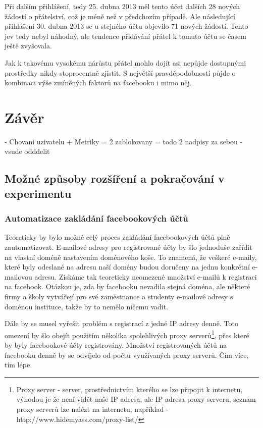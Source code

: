 \documentclass[thesis=M,czech]{FITthesis}[2013/05/10]
\begin{document}
Při dalším přihlášení, tedy 25. dubna 2013 měl tento účet dalších 28 nových žádostí o přátelství, což je méně než v předchozím případě. Ale následující přihlášení 30. dubna 2013 se u stejného účtu objevilo 71 nových žádostí. Tento jev tedy nebyl náhodný, ale tendence přidávání přátel k tomuto účtu se časem ještě zvyšovala.

Jak k takovému vysokému nárůstu přátel mohlo dojít asi nepůjde dostupnými prostředky nikdy stoprocentně zjistit. S největší pravděpodobností půjde o kombinaci výše zmíněných faktorů na facebooku i mimo něj.

\chapter{Z{\' a}v{\v e}r}

- Chovani uzivatelu + Metriky
= 2 zablokovany
= todo 2 nadpisy za sebou - vsude odddelit

\section{Možné způsoby rozšíření a pokračování v experimentu}

\subsection{Automatizace zakládání facebookových účtů}
Teoreticky by bylo možné celý proces zakládání facebookových účtů plně zautomatizovat. E-mailové adresy pro registrované účty by šlo jednoduše zařídit na vlastní doméně nastavením doménového koše. To znamená, že veškeré e-maily, které byly odeslané na adresu naší domény budou doručeny na jednu konkrétní e-mailovou adresu. Získáme tak teoreticky neomezené množství e-mailů k registraci na facebook. Otázkou je, zda by facebooku nevadila stejná doména, ale některé firmy a školy vytvářejí pro své zaměstnance a studenty e-mailové adresy s doménou instituce, takže by to nemělo ničemu vadit.

Dále by se musel vyřešit problém s registrací z jedné IP adresy denně. Toto omezení by šlo obejít použitím několika spolehlivých proxy serverů\footnote{Proxy server - server, prostřednictvím kterého se lze připojit k internetu, výhodou je že není vidět naše IP adresa, ale IP adresa proxy serveru, seznam proxy serverů lze nalézt na internetu, například - http://www.hidemyass.com/proxy-list/}, přes které by byly facebookové účty registrovány. Množství registrovaných účtů na facebooku denně by se odvíjelo od počtu využívaných proxy serverů. Čím více, tím lépe.
\end{document}

